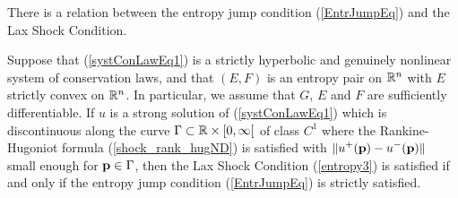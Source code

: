 There is a relation between the entropy jump condition
(\ref{EntrJumpEq}) and the Lax Shock Condition.

\begin{theorem}
Suppose that (\ref{systConLawEq1}) is a strictly hyperbolic and
genuinely nonlinear system of conservation laws, and that
$(E,F)$ is an entropy pair on $\mathbb{R}^n$ with $E$ strictly convex on
$\mathbb{R}^n$.  In particular, we assume that $G$, $E$ and $F$ are
sufficiently differentiable.
If $u$ is a strong solution of (\ref{systConLawEq1}) which
is discontinuous along the curve $\Gamma \subset \mathbb{R} \times [0,\infty[$ of
class $\displaystyle C^1$ where the Rankine-Hugoniot formula
(\ref{shock_rank_hugND}) is satisfied with
$\displaystyle \|u^+(\mathbf{p})-u^-(\mathbf{p})\|$ small enough for
$\mathbf{p} \in \Gamma$, then the Lax Shock Condition (\ref{entropy3}) is
satisfied if and only if the entropy jump condition (\ref{EntrJumpEq})
is strictly satisfied.
\end{theorem}

